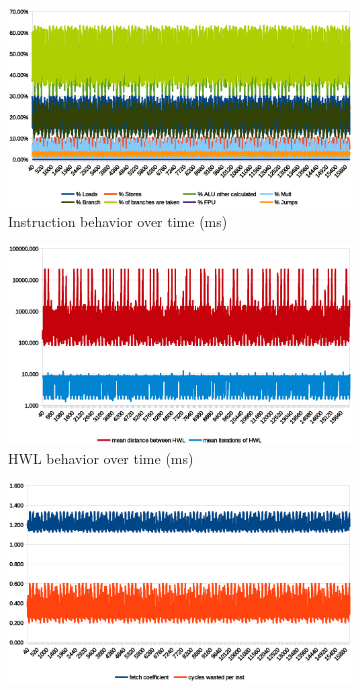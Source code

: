 \documentclass[../bachelor_paper.tex]{subfiles}
\begin{document}
\begin{figure}
    \begin{subfigure}{0.45\textwidth}
        \includegraphics[width=\textwidth]{img/graph/coremark/coremark_inst.eps}
        \caption{Instruction behavior over time (ms)}
        \label{fig:res/coremark/inst}
    \end{subfigure}
    \begin{subfigure}{0.45\textwidth}
        \includegraphics[width=\textwidth]{img/graph/coremark/coremark_hwl.eps}
        \caption{\ac{HWL} behavior over time (ms)}
        \label{fig:res/coremark/hwl}
    \end{subfigure}
    \begin{subfigure}{0.45\textwidth}
        \includegraphics[width=\textwidth]{img/graph/coremark/coremark_fetch_waste.eps}

\end{subfigure}
\end{figure}
\end{document}
